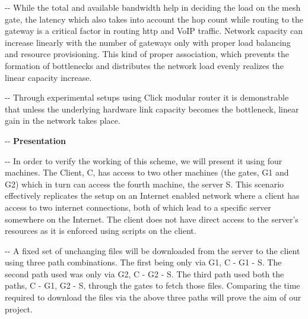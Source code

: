 \documentclass[12pt]{article}
\makeatletter
\newenvironment{indentation}[3]%
	{\par\setlength{\parindent}{#3}
	\setlength{\leftmargin}{#1}       \setlength{\rightmargin}{#1}%
	\advance\linewidth -\leftmargin       \advance\linewidth -\rightmargin%
	\advance\@totalleftmargin\leftmargin  \@setpar{{\@@par}}%
	\parshape 1\@totalleftmargin \linewidth\ignorespaces}{\par}%
\makeatother
\begin{document}
\begin{indentation}{0pt}{0pt}{0pt}
{\normalsize \hspace{1cm}While the total and available bandwidth help in deciding the load on the mesh gate, the latency which also takes into account the hop count while routing to the gateway is a critical factor in routing http and VoIP traffic. Network capacity can increase linearly with the number of gateways only with proper load balancing and resource provisioning. This kind of proper association, which prevents the formation of bottlenecks and distributes the network load evenly realizes the linear capacity increase.}
\end{indentation}


\begin{indentation}{0pt}{0pt}{0pt}
{\normalsize \hspace{1cm} Through experimental setups using Click modular router it is demonstrable that unless the underlying hardware link capacity becomes the bottleneck, linear gain in the network takes place.}
\end{indentation}

\pagebreak
\begin{indentation}{0pt}{0pt}{0pt}
\vspace{1cm}
\textbf{{{\Large Presentation}}}
\end{indentation}
\vspace{0.5cm}
\begin{indentation}{0pt}{0pt}{0pt}
{\normalsize \hspace{1cm} In order to verify the working of this scheme, we will present it using four machines. The Client, C, has access to two other machines (the gates, G1 and G2) which in turn can access the fourth machine, the server S. This scenario effectively replicates the setup on an Internet enabled network where a client has access to two internet connections, both of which lead to a specific server somewhere on the Internet. The client does not have direct access to the server's resources as it is enforced using scripts on the client.}
\end{indentation}

\begin{indentation}{0pt}{0pt}{0pt}
{\normalsize \hspace{1cm} A fixed set of unchanging files will be downloaded from the server to the client using three path combinations. The first being only via G1, C - G1 - S. The second path used was only via G2, C - G2 - S. The third path used both the paths, C - G1, G2 - S,  through the gates to fetch those files. Comparing the time required to download the files via the above three paths will prove the aim of our project.}
\end{indentation}
\end{document}
